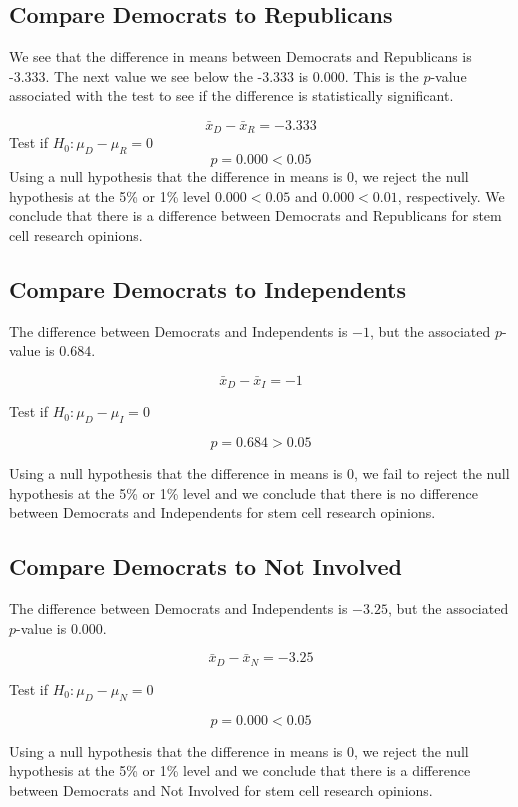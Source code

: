\documentclass[
]{book}
\begin{document}
\subsection{Compare Democrats to Republicans}\label{compare-democrats-to-republicans}

We see that the difference in means between Democrats and Republicans is -3.333. The next value we see below the -3.333 is 0.000. This is the \(p\)-value associated with the test to see if the difference is statistically significant.

\[ \bar{x}_D - \bar{x}_R = -3.333 \]
Test if \(H_0: \mu_D - \mu_R = 0\)
\[ p = 0.000 < 0.05 \]
Using a null hypothesis that the difference in means is 0, we reject the null hypothesis at the 5\% or 1\% level \(0.000 < 0.05\) and \(0.000 < 0.01\), respectively. We conclude that there is a difference between Democrats and Republicans for stem cell research opinions.

\subsection{Compare Democrats to Independents}\label{compare-democrats-to-independents}

The difference between Democrats and Independents is \(-1\), but the associated \(p\)-value is \(0.684\).

\[ \bar{x}_D - \bar{x}_I = -1 \]

Test if \(H_0: \mu_D - \mu_I = 0\)

\[ p = 0.684 > 0.05\]

Using a null hypothesis that the difference in means is 0, we fail to reject the null hypothesis at the 5\% or 1\% level and we conclude that there is no difference between Democrats and Independents for stem cell research opinions.

\subsection{Compare Democrats to Not Involved}\label{compare-democrats-to-not-involved}

The difference between Democrats and Independents is \(-3.25\), but the associated \(p\)-value is \(0.000\).

\[ \bar{x}_D - \bar{x}_N = -3.25 \]

Test if \(H_0: \mu_D - \mu_N = 0\)

\[ p = 0.000 < 0.05\]

Using a null hypothesis that the difference in means is 0, we reject the null hypothesis at the 5\% or 1\% level and we conclude that there is a difference between Democrats and Not Involved for stem cell research opinions.
\end{document}
